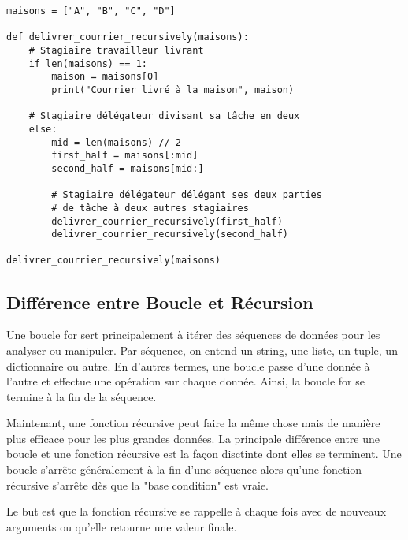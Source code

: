 \begin{verbatim}
maisons = ["A", "B", "C", "D"]

def delivrer_courrier_recursively(maisons):
    # Stagiaire travailleur livrant
    if len(maisons) == 1:
        maison = maisons[0]
        print("Courrier livré à la maison", maison)

    # Stagiaire délégateur divisant sa tâche en deux
    else:
        mid = len(maisons) // 2
        first_half = maisons[:mid]
        second_half = maisons[mid:]

        # Stagiaire délégateur délégant ses deux parties 
        # de tâche à deux autres stagiaires
        delivrer_courrier_recursively(first_half)
        delivrer_courrier_recursively(second_half)
        
delivrer_courrier_recursively(maisons)
\end{verbatim}

\subsection{Différence entre Boucle et Récursion}

Une boucle for sert principalement à itérer des séquences de données pour les analyser ou manipuler. Par séquence, on entend un string, une liste, un tuple, un dictionnaire ou autre. En d'autres termes, une boucle passe d'une donnée à l'autre et effectue une opération sur chaque donnée. Ainsi, la boucle for se termine à la fin de la séquence. 

Maintenant, une fonction récursive peut faire la même chose mais de manière plus efficace pour les plus grandes données. La principale différence entre une boucle et une fonction récursive est la façon disctinte dont elles se terminent. Une boucle s'arrête généralement à la fin d'une séquence alors qu'une fonction récursive s'arrête dès que la "base condition" est vraie. 

Le but est que la fonction récursive se rappelle à chaque fois avec de nouveaux arguments ou qu'elle retourne une valeur finale. \\


